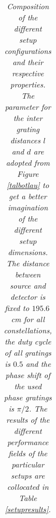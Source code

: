 \begin{table}[h]
\begin{center}
\begin{tabular}{c|c|c|c|c|c|c}
		\end{tabular}
	\end{center}
	\caption[Set of the properties of the different characterized setups]{\textit{Composition of the different setup configurations and their respective properties. The parameter for the inter grating distances $l$ and $d$ are adopted from Figure \ref{talbotlau} to get a better imagination of the different setup dimensions. The distance between source and detector is fixed to $195.6\,$cm for all constellations, the duty cycle of all gratings is $0.5$ and the phase shift of the used phase gratings is $\pi/2$. The results of the different performance fields of the particular setups are collocated in Table \ref{setupresults}.}}
	\label{tablesetupcomp}
\end{table}

